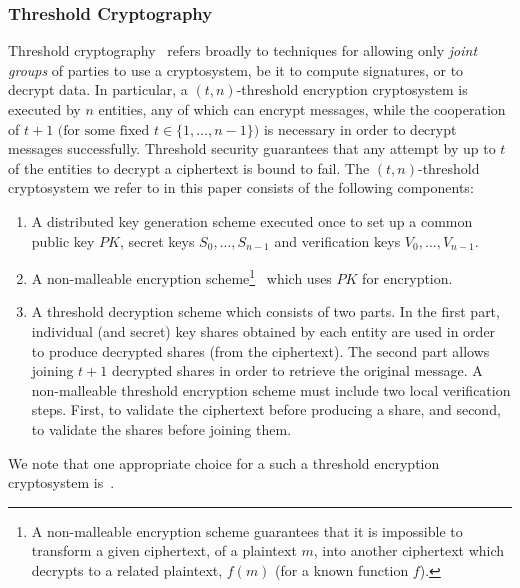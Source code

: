 \subsubsection*{Threshold Cryptography}
\label{Threshold_Cryptography}
Threshold cryptography~\cite{thresholdcrypto} refers broadly to techniques for allowing only \emph{joint groups} of parties to use a cryptosystem, be it to compute signatures, or to decrypt data. In particular, a $(t,n)$-threshold encryption cryptosystem is executed by $n$ entities, any of which can encrypt messages, while the cooperation of $t+1$ $\big( \text{for some fixed } t \in \{1,\dots,n-1\} \big)$ is necessary in order to decrypt messages successfully. Threshold security guarantees that any attempt by up to $t$ of the entities to decrypt a ciphertext is bound to fail. The $(t,n)$-threshold cryptosystem we refer to in this paper consists of the following components: 
\begin{enumerate}
\item A distributed key generation scheme executed once to set up a common public key $PK$, secret keys $S_0,\dots,S_{n-1}$ and verification keys $V_0,\dots,V_{n-1}$.
\item A non-malleable encryption scheme\footnote{A non-malleable encryption scheme guarantees that it is impossible to transform a given ciphertext, of a plaintext $m$, into another ciphertext which decrypts to a related plaintext, $f(m)$ (for a known function $f$).}~\cite{malleable} which uses $PK$ for encryption.  %
\item A threshold decryption scheme which consists of two parts. In the first part, individual (and secret) key shares obtained by each entity are used in order to produce decrypted shares (from the ciphertext). The second part allows joining $t+1$ decrypted shares in order to retrieve the original message. A non-malleable threshold encryption scheme must include two local verification steps. First, to validate the ciphertext before producing a share, and second, to validate the shares before joining them.
\end{enumerate}
We note that one appropriate choice for a such a threshold encryption cryptosystem is~\cite{Shoup-Gennaro}.



